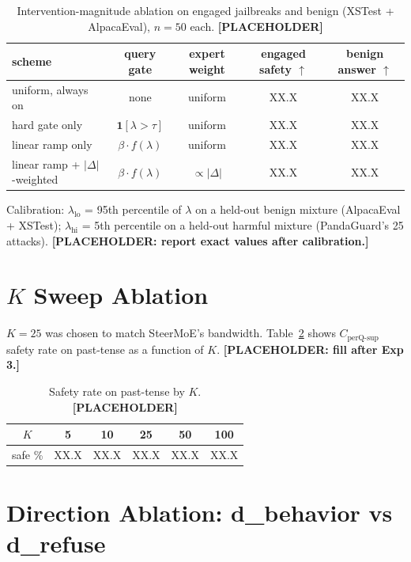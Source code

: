 \begin{table}[h]
\centering
\caption{Intervention-magnitude ablation on engaged jailbreaks and
benign (XSTest + AlpacaEval), $n{=}50$ each. \textbf{[PLACEHOLDER]}}
\label{tab:adaptive}
\small
\begin{tabular}{lcccc}
\toprule
scheme & query gate & expert weight & engaged safety $\uparrow$ & benign answer $\uparrow$ \\
\midrule
uniform, always on  & none          & uniform    & XX.X & XX.X \\
hard gate only      & $\mathbf{1}[\lambda > \tau]$ & uniform    & XX.X & XX.X \\
linear ramp only    & $\beta \cdot f(\lambda)$ & uniform & XX.X & XX.X \\
linear ramp + $|\Delta|$-weighted   & $\beta \cdot f(\lambda)$ & $\propto |\Delta|$ & XX.X & XX.X \\
\bottomrule
\end{tabular}
\end{table}

Calibration: $\lambda_{\text{lo}}$ = 95th percentile of $\lambda$ on a
held-out benign mixture (AlpacaEval + XSTest); $\lambda_{\text{hi}}$ =
5th percentile on a held-out harmful mixture (PandaGuard's 25 attacks).
\textbf{[PLACEHOLDER: report exact values after calibration.]}

\section{$K$ Sweep Ablation}
\label{app:ksweep}

$K{=}25$ was chosen to match SteerMoE's bandwidth. Table~\ref{tab:ksweep}
shows $C_{\text{perQ-sup}}$ safety rate on past-tense as a function of
$K$. \textbf{[PLACEHOLDER: fill after Exp 3.]}

\begin{table}[h]
\centering
\caption{Safety rate on past-tense by $K$. \textbf{[PLACEHOLDER]}}
\label{tab:ksweep}
\small
\begin{tabular}{cccccc}
\toprule
$K$ & 5 & 10 & 25 & 50 & 100 \\
\midrule
safe \% & XX.X & XX.X & XX.X & XX.X & XX.X \\
\bottomrule
\end{tabular}
\end{table}

\section{Direction Ablation: d\_behavior vs d\_refuse}
\label{app:drefuse}

